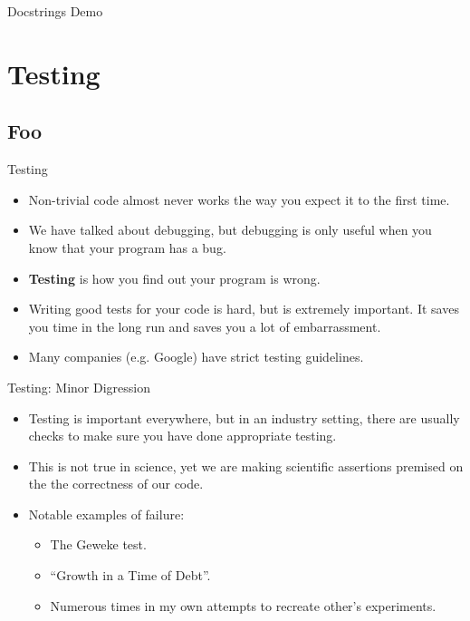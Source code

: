 \documentclass[serif,xcolor=pdftex,dvipsnames,table,hyperref={bookmarks=false,breaklinks}]{beamer}
\begin{document}
\begin{frame}[t]{Docstrings}
	\centering
	\Huge{Demo}
\end{frame}

\section{Testing}
\subsection{Foo}

\begin{frame}[t]{Testing}
	\begin{itemize}[<+->]
		\item Non-trivial code almost never works the way you expect it to the first time.
		\item We have talked about debugging, but debugging is only useful when you know that your program has a bug.
		\item \textbf{Testing} is how you find out your program is wrong.
		\item Writing good tests for your code is hard, but is extremely important. It saves you time in the long run and saves you a lot of embarrassment.
		\item Many companies (e.g. Google) have strict testing guidelines.
	\end{itemize}
\end{frame}

\begin{frame}[t]{Testing: Minor Digression}
	\begin{itemize}[<+->]
		\item Testing is important everywhere, but in an industry setting, there are usually checks to make sure you have done appropriate testing.
		\item This is not true in science, yet we are making scientific assertions premised on the the correctness of our code.
		\item Notable examples of failure:
		\begin{itemize}[<+->]
			\item The Geweke test.
			\item ``Growth in a Time of Debt''.
			\item Numerous times in my own attempts to recreate other's experiments.
		\end{itemize}
	\end{itemize}
\end{frame}
\end{document}
